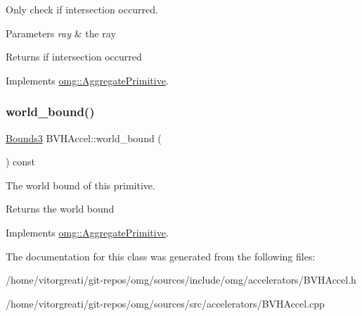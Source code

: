 Only check if intersection occurred. 


\begin{DoxyParams}{Parameters}
{\em ray} & the ray \\
\hline
\end{DoxyParams}
\begin{DoxyReturn}{Returns}
if intersection occurred 
\end{DoxyReturn}


Implements \mbox{\hyperlink{classomg_1_1_aggregate_primitive_af6009e1c54b0f2341d78d95afb4268cc}{omg\+::\+Aggregate\+Primitive}}.

\mbox{\label{classomg_1_1_b_v_h_accel_a8de5010cc4ddf9e0673461d711b9930b}} 
\subsubsection{\texorpdfstring{world\_bound()}{world\_bound()}}
{\footnotesize\ttfamily \mbox{\hyperlink{classomg_1_1_bounds3}{Bounds3}} B\+V\+H\+Accel\+::world\+\_\+bound (\begin{DoxyParamCaption}{ }\end{DoxyParamCaption}) const\hspace{0.3cm}{\ttfamily [virtual]}}



The world bound of this primitive. 

\begin{DoxyReturn}{Returns}
the world bound 
\end{DoxyReturn}


Implements \mbox{\hyperlink{classomg_1_1_aggregate_primitive_ad8a385aaa01354acffad18fe8f23fa25}{omg\+::\+Aggregate\+Primitive}}.



The documentation for this class was generated from the following files\+:\begin{DoxyCompactItemize}
\item 
/home/vitorgreati/git-\/repos/omg/sources/include/omg/accelerators/B\+V\+H\+Accel.\+h\item 
/home/vitorgreati/git-\/repos/omg/sources/src/accelerators/B\+V\+H\+Accel.\+cpp\end{DoxyCompactItemize}
